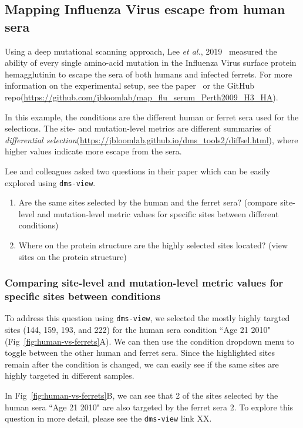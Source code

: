 \subsection{Mapping Influenza Virus escape from human sera}

Using a deep mutational scanning approach, Lee \textit{et al.}, 2019~\cite{lee2019mapping} measured the ability of every single amino-acid mutation in the Influenza Virus surface protein hemagglutinin to escape the sera of both humans and infected ferrets.
For more information on the experimental setup, see the paper~\cite{lee2019mapping} or the GitHub repo(\url{https://github.com/jbloomlab/map_flu_serum_Perth2009_H3_HA}).

In this example, the conditions are the different human or ferret sera used for the selections.
The site- and mutation-level metrics are different summaries of \textit{differential selection}(\url{https://jbloomlab.github.io/dms_tools2/diffsel.html}), where higher values indicate more escape from the sera.

Lee and colleagues asked two questions in their paper which can be easily explored using \texttt{dms-view}.

\begin{enumerate}
  \item Are the same sites selected by the human and the ferret sera? (compare site-level and mutation-level metric values for specific sites between different conditions)
  \item Where on the protein structure are the highly selected sites located? (view sites on the protein structure)
\end{enumerate}

\subsubsection{Comparing site-level and mutation-level metric values for specific sites between conditions}

To address this question using \texttt{dms-view}, we selected the mostly highly targted sites (144, 159, 193, and 222) for the human sera condition ``Age 21 2010" (Fig~\ref{fig:human-vs-ferrets}A).
We can then use the condition dropdown menu to toggle between the other human and ferret sera.
Since the highlighted sites remain after the condition is changed, we can easily see if the same sites are highly targeted in different samples.

In Fig~\ref{fig:human-vs-ferrets}B, we can see that 2 of the sites selected by the human sera ``Age 21 2010" are also targeted by the ferret sera 2.
To explore this question in more detail, please see the \texttt{dms-view} link XX.

